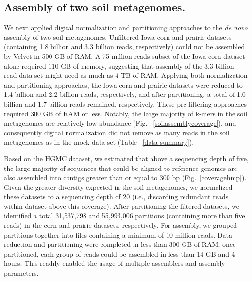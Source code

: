 \documentclass{pnastwo}
\begin{document}
\begin{article}
\subsection*{Assembly of two soil metagenomes.} We next applied digital
normalization and partitioning approaches to the {\em de novo} assembly of two
soil metagenomes. Unfiltered Iowa corn and prairie datasets (containing 1.8
billion and 3.3 billion reads, respectively) could not be assembled by Velvet in
500 GB of RAM. A 75 million reads subset of the Iowa corn dataset alone required
110 GB of memory, suggesting that assembly of the 3.3 billion read data set
might need as much as 4 TB of RAM. Applying both normalization and partitioning approaches, 
the Iowa corn and prairie datasets were reduced to
1.4 billion and 2.2 billion reads, respectively, and after partitioning, a total
of 1.0 billion and 1.7 billion reads remained, respectively. These pre-filtering
approaches required 300 GB of RAM or less. Notably, the large majority of k-mers
in the soil metagenomes are relatively low-abundance (Fig.
~\ref{soilassemblycoverage}), and consequently digital normalization did not
remove as many reads in the soil metagenomes as in the mock data set (Table
~\ref{data-summary}).

Based on the HGMC dataset, we estimated that above a sequencing depth of five,
the large majority of sequences that could be aligned to reference genomes are also assembled into contigs greater than or
equal to 300 bp (Fig.~\ref{coveragehmp}). Given the greater diversity expected in
the soil metagenomes, we normalized these datasets to a sequencing depth of 20
(i.e., discarding redundant reads within dataset above this coverage). After
partitioning the filtered datasets, we identified a total 31,537,798 and
55,993,006 partitions (containing more than five reads) in the corn and prairie
datasets, respectively. For assembly, we grouped partitions together into files
containing a minimum of 10 million reads. Data reduction and partitioning were
completed in less than 300 GB of RAM; once partitioned, each group of reads
could be assembled in less than 14 GB and 4 hours. This readily enabled the
usage of multiple assemblers and assembly parameters.


\end{article}
\end{document}
